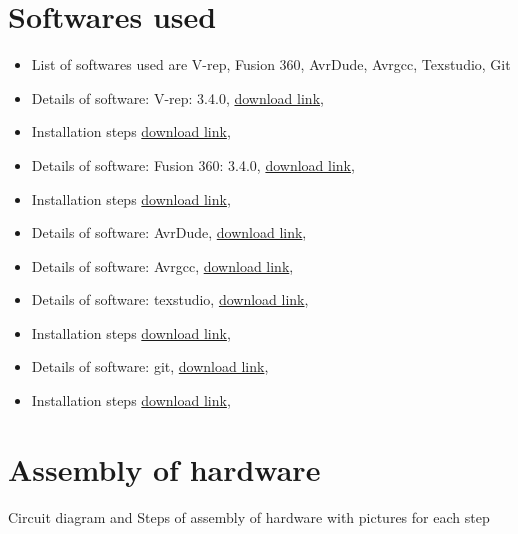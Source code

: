 \documentclass[a4paper,12pt,oneside]{book}
\begin{document}
\chapter[Softwares used]{Softwares used}
\begin{itemize}
  \item List of softwares used are V-rep, Fusion 360, AvrDude, Avrgcc, Texstudio, Git 
  \item Details of software: V-rep: 3.4.0, \href{http://www.coppeliarobotics.com/}{download link}, 
  \item Installation steps \href{http://www.coppeliarobotics.com/resources.html}{download link},
  \item Details of software: Fusion 360: 3.4.0, \href{https://www.autodesk.com/products/fusion-360/students-teachers-educators}{download link},
  \item Installation steps \href{https://www.autodesk.com/products/fusion-360/students-teachers-educators}{download link},
  \item Details of software: AvrDude, \href{http://www.nongnu.org/avrdude/}{download link},
  \item Details of software: Avrgcc, \href{https://gcc.gnu.org/wiki/avr-gcc}{download link},
  \item Details of software: texstudio, \href{http://www.texstudio.org/}{download link},
  \item Installation steps \href{http://www.texstudio.org/}{download link},
  \item Details of software: git, \href{https://git-scm.com/}{download link},
  \item Installation steps \href{https://git-scm.com/}{download link},
\end{itemize}

\newpage

\chapter{Assembly of hardware}
Circuit diagram and Steps of assembly of hardware with pictures for each step
\end{document}
